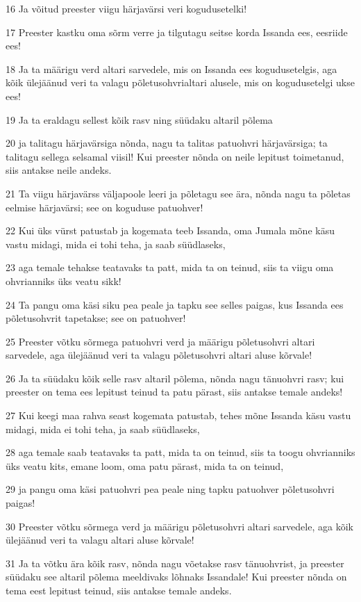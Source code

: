 \par 16 Ja võitud preester viigu härjavärsi veri kogudusetelki!
\par 17 Preester kastku oma sõrm verre ja tilgutagu seitse korda Issanda ees, eesriide ees!
\par 18 Ja ta määrigu verd altari sarvedele, mis on Issanda ees kogudusetelgis, aga kõik ülejäänud veri ta valagu põletusohvrialtari alusele, mis on kogudusetelgi ukse ees!
\par 19 Ja ta eraldagu sellest kõik rasv ning süüdaku altaril põlema
\par 20 ja talitagu härjavärsiga nõnda, nagu ta talitas patuohvri härjavärsiga; ta talitagu sellega selsamal viisil! Kui preester nõnda on neile lepitust toimetanud, siis antakse neile andeks.
\par 21 Ta viigu härjavärss väljapoole leeri ja põletagu see ära, nõnda nagu ta põletas eelmise härjavärsi; see on koguduse patuohver!
\par 22 Kui üks vürst patustab ja kogemata teeb Issanda, oma Jumala mõne käsu vastu midagi, mida ei tohi teha, ja saab süüdlaseks,
\par 23 aga temale tehakse teatavaks ta patt, mida ta on teinud, siis ta viigu oma ohvrianniks üks veatu sikk!
\par 24 Ta pangu oma käsi siku pea peale ja tapku see selles paigas, kus Issanda ees põletusohvrit tapetakse; see on patuohver!
\par 25 Preester võtku sõrmega patuohvri verd ja määrigu põletusohvri altari sarvedele, aga ülejäänud veri ta valagu põletusohvri altari aluse kõrvale!
\par 26 Ja ta süüdaku kõik selle rasv altaril põlema, nõnda nagu tänuohvri rasv; kui preester on tema ees lepitust teinud ta patu pärast, siis antakse temale andeks!
\par 27 Kui keegi maa rahva seast kogemata patustab, tehes mõne Issanda käsu vastu midagi, mida ei tohi teha, ja saab süüdlaseks,
\par 28 aga temale saab teatavaks ta patt, mida ta on teinud, siis ta toogu ohvrianniks üks veatu kits, emane loom, oma patu pärast, mida ta on teinud,
\par 29 ja pangu oma käsi patuohvri pea peale ning tapku patuohver põletusohvri paigas!
\par 30 Preester võtku sõrmega verd ja määrigu põletusohvri altari sarvedele, aga kõik ülejäänud veri ta valagu altari aluse kõrvale!
\par 31 Ja ta võtku ära kõik rasv, nõnda nagu võetakse rasv tänuohvrist, ja preester süüdaku see altaril põlema meeldivaks lõhnaks Issandale! Kui preester nõnda on tema eest lepitust teinud, siis antakse temale andeks.
